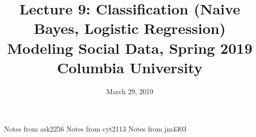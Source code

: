 \documentclass{article}
\title{
Lecture 9: Classification (Naive Bayes, Logistic Regression) \\  %
Modeling Social Data, Spring 2019 \\   %
Columbia University                    %
}
\date{March 29, 2019}                %
\makeatletter
\let\org@subfile
\renewcommand*{}[1]{%
  \filename@parse{#1}%
  \expandafter
  \graphicspath\expandafter{\expandafter{\filename@area}}%
  \org@subfile{#1}%
}
\makeatother
\begin{document}
\maketitle


\pagebreak \newpage \noindent\Huge{Notes from ask2256} \normalsize \setcounter{section}{0} 
\pagebreak \newpage \noindent\Huge{Notes from cyt2113} \normalsize \setcounter{section}{0} 
\pagebreak \newpage \noindent\Huge{Notes from jm4303} \normalsize \setcounter{section}{0} 
\end{document}
